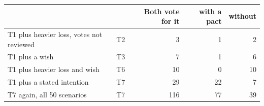 \begin{tabular}{@{}llrrr@{}}
\toprule
 &  & Both vote for it & with a pact & without \\
\midrule
T1 plus heavier loss, votes not reviewed & T2 & 3 & 1 & 2 \\
T1 plus a wish & T3 & 7 & 1 & 6 \\
T1 plus heavier loss and wish & T6 & 10 & 0 & 10 \\
T1 plus a stated intention & T7 & 29 & 22 & 7 \\
T7 again, all 50 scenarios & T7 & 116 & 77 & 39 \\
\bottomrule
\end{tabular}
